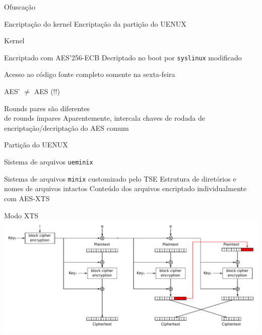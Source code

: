 \documentclass[14pt]{beamer}
\begin{document}
\begin{frame}{Ofuscação}
  \begin{fullpageitemize}
    \itemR Encriptação do kernel
    \itemR Encriptação da partição do UENUX
  \end{fullpageitemize}
\end{frame}

\begin{frame}{Kernel}
  \begin{fullpageitemize}
    \itemR Encriptado com AES'256-ECB
    \itemR Decriptado no boot por \texttt{syslinux} modificado
      \begin{itemize}
        \itemR Acesso ao código fonte completo somente na sexta-feira
      \end{itemize}
    \itemR AES' $\mathbf{\neq}$ AES (!!)
      \begin{itemize}
        \itemR Rounds pares são diferentes\\de rounds ímpares
        \itemR Aparentemente, intercala chaves de rodada de encriptação/decriptação do AES comum
      \end{itemize}
  \end{fullpageitemize}
\end{frame}

\begin{frame}{Partição do UENUX}
  \begin{fullpageitemize}
    \itemR Sistema de arquivos \texttt{ueminix}
      \begin{itemize}
        \itemR Sistema de arquivos \texttt{minix} customizado pelo TSE
        \itemR Estrutura de diretórios e \\nomes de arquivos intactos
        \itemR Conteúdo dos arquivos encriptado individualmente com AES-XTS
      \end{itemize}
  \end{fullpageitemize}
\end{frame}

\begin{frame}{Modo XTS}
  \vfill
  {\centering
  \includegraphics[width=\textwidth,height=0.90\textheight,keepaspectratio]{images/XTS_mode_encryption}}
  \vfill
\end{frame}
\end{document}
